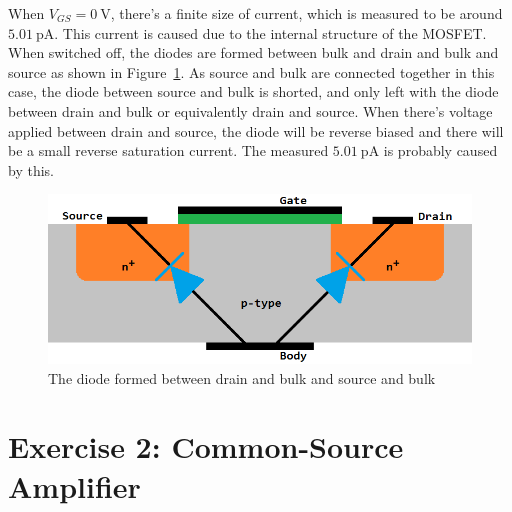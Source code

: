 \documentclass[12pt]{article}   %
\begin{document}
	When $V_{GS} = \SI{0}{\volt}$, there's a finite size of current, which is measured to be around $\SI{5.01}{\pico\ampere}$. This current is caused due to the internal structure of the MOSFET. When switched off, the diodes are formed between bulk and drain and bulk and source as shown in Figure~\ref{fig:bodyDiode}. As source and bulk are connected together in this case, the diode between source and bulk is shorted, and only left with the diode between drain and bulk or equivalently drain and source. When there's voltage applied between drain and source, the diode will be reverse biased and there will be a small reverse saturation current. The measured $\SI{5.01}{\pico \ampere}$ is probably caused by this.
	
	\begin{figure}[htbp]
		\centering
		\includegraphics[width = 0.5\linewidth]{Figures/E1_NMOS_Characteristic/Body_diode}
		\caption{The diode formed between drain and bulk and source and bulk\cite{schmidtFETsFieldEffectTransistors2021}}
		\label{fig:bodyDiode}
	\end{figure}
	
	\newpage
	
	\section{Exercise 2: Common-Source Amplifier}
	
\end{document}
